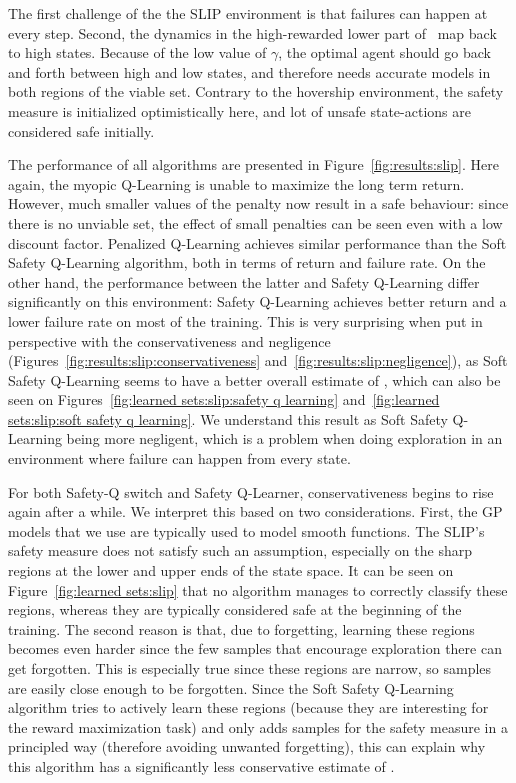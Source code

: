 The first challenge of the the SLIP environment is that failures can happen at every step. Second, the dynamics in the high-rewarded lower part of \QV~map back to high states. Because of the low value of $\gamma$, the optimal agent should go back and forth between high and low states, and therefore needs accurate models in both regions of the viable set. Contrary to the hovership environment, the safety measure is initialized optimistically here, and lot of unsafe state-actions are considered safe initially.\par
The performance of all algorithms are presented in Figure~\ref{fig:results:slip}. Here again, the myopic Q-Learning is unable to maximize the long term return. However, much smaller values of the penalty now result in a safe behaviour: since there is no unviable set, the effect of small penalties can be seen even with a low discount factor. Penalized Q-Learning achieves similar performance than the Soft Safety Q-Learning algorithm, both in terms of return and failure rate. On the other hand, the performance between the latter and Safety Q-Learning differ significantly on this environment: Safety Q-Learning achieves better return and a lower failure rate on most of the training. This is very surprising when put in perspective with the conservativeness and negligence (Figures~\ref{fig:results:slip:conservativeness} and~\ref{fig:results:slip:negligence}), as Soft Safety Q-Learning seems to have a better overall estimate of \QV, which can also be seen on Figures~\ref{fig:learned sets:slip:safety q learning} and~\ref{fig:learned sets:slip:soft safety q learning}. We understand this result as Soft Safety Q-Learning being more negligent, which is a problem when doing exploration in an environment where failure can happen from every state.\par
For both Safety-Q switch and Safety Q-Learner, conservativeness begins to rise again after a while. We interpret this based on two considerations. First, the GP models that we use are typically used to model smooth functions. The SLIP's safety measure does not satisfy such an assumption, especially on the sharp regions at the lower and upper ends of the state space. It can be seen on Figure~\ref{fig:learned sets:slip} that no algorithm manages to correctly classify these regions, whereas they are typically considered safe at the beginning of the training. The second reason is that, due to forgetting, learning these regions becomes even harder since the few samples that encourage exploration there can get forgotten. This is especially true since these regions are narrow, so samples are easily close enough to be forgotten. Since the Soft Safety Q-Learning algorithm tries to actively learn these regions (because they are interesting for the reward maximization task) and only adds samples for the safety measure in a principled way (therefore avoiding unwanted forgetting), this can explain why this algorithm has a significantly less conservative estimate of \QV.\par
